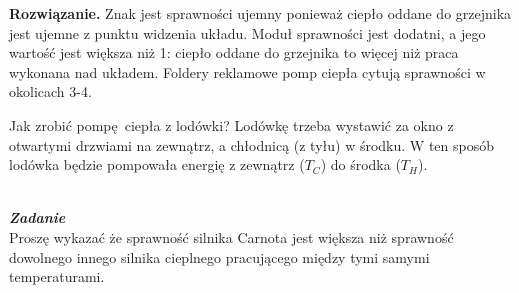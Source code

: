 \documentclass[11pt,a4paper]{article}
\newcounter{zadanie}\newcommand{\zadanie}[1][]{\addtocounter{zadanie}{1} ~\\ {\bf \emph{Zadanie \arabic{zadanie} #1 }} \\}
\newenvironment{solution}{\vspace{1cm} \par\textbf{Rozwiązanie.} \vspace{1cm}}{}
\begin{document}
\begin{solution}
Znak jest sprawności ujemny ponieważ ciepło oddane do grzejnika 
jest ujemne z punktu widzenia układu. Moduł sprawności jest dodatni, 
a jego wartość jest większa niż 1: ciepło oddane do grzejnika 
to więcej niż praca wykonana nad układem.
Foldery reklamowe pomp ciepła cytują sprawności w okolicach 3-4.

Jak zrobić pompę ciepła z lodówki?
Lodówkę trzeba wystawić za okno z otwartymi drzwiami na zewnątrz, 
a chłodnicą (z tyłu) w środku. W ten sposób lodówka będzie pompowała
energię z zewnątrz ($T_C$) do środka ($T_H$).

\newpage 
\end{solution}
\zadanie[]


Proszę wykazać że sprawność silnika Carnota jest większa niż sprawność 
dowolnego innego silnika cieplnego pracującego między tymi samymi temperaturami.
\end{document}
